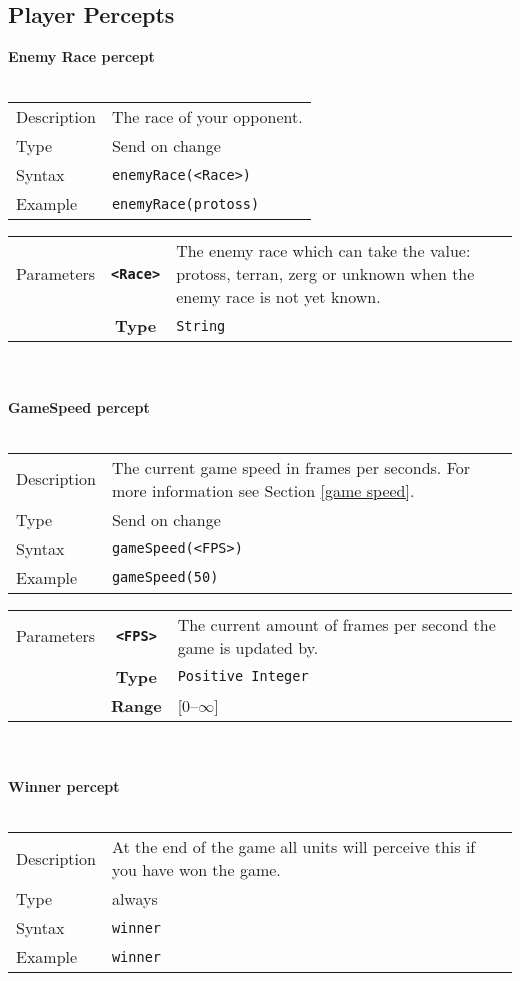 \subsection{Player Percepts}
\textbf{Enemy Race percept}\\
\\
\begin{tabularx}{\textwidth}{lX}
 Description & The race of your opponent. \\
 Type & Send on change \\
 Syntax &  \verb|enemyRace(<Race>)| \\
 Example & \verb|enemyRace(protoss)|   \\ 
 \end{tabularx}
 \begin{tabularx}{\textwidth}{l | c | p{8cm}|}
 \cline{2-3} 
  Parameters & \textbf{\verb|<Race>|} & The enemy race which can take the value: protoss, terran, zerg or unknown                 when the enemy race is not yet known. \\
             & \textbf{Type} & \verb|String| \\
            \cline{2-3} 
\end{tabularx}
\\\\
\noindent
\textbf{GameSpeed percept}\\
\\
\begin{tabularx}{\textwidth}{lX}
 Description & The current game speed in frames per seconds. For more information see Section \ref{game speed}. \\
 Type & Send on change \\
 Syntax &  \verb|gameSpeed(<FPS>)| \\
 Example & \verb|gameSpeed(50)|   \\ 
 \end{tabularx}
 \begin{tabularx}{\textwidth}{l | c | p{8cm}|}
 \cline{2-3} 
  Parameters & \textbf{\verb|<FPS>|} & The current amount of frames per second the game is updated by. \\
             & \textbf{Type} & \verb|Positive Integer| \\
             & \textbf{Range} & [0--$\infty$] \\
            \cline{2-3} 
\end{tabularx}
\\\\
\noindent
\textbf{Winner percept}\\
\\
\begin{tabularx}{\textwidth}{lX}
 Description & At the end of the game all units will perceive this if you have won the game. \\
 Type & always \\
 Syntax &  \verb|winner| \\
 Example & \verb|winner|   \\ 
 \end{tabularx}


